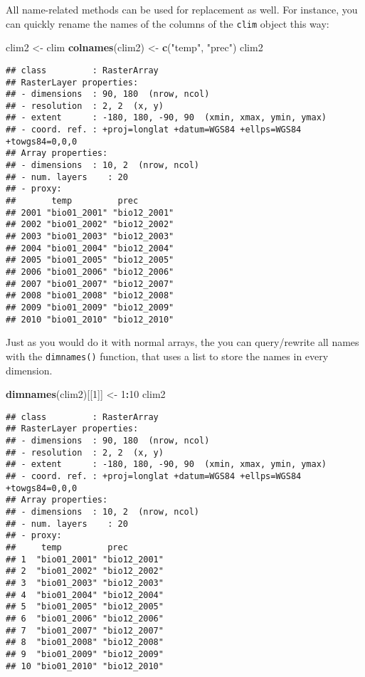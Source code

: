 \documentclass[]{article}
\newenvironment{Shaded}{\begin{snugshade}}{\end{snugshade}}
\newcommand{\KeywordTok}[1]{\textcolor[rgb]{0.13,0.29,0.53}{\textbf{#1}}}
\newcommand{\DecValTok}[1]{\textcolor[rgb]{0.00,0.00,0.81}{#1}}
\newcommand{\StringTok}[1]{\textcolor[rgb]{0.31,0.60,0.02}{#1}}
\newcommand{\OperatorTok}[1]{\textcolor[rgb]{0.81,0.36,0.00}{\textbf{#1}}}
\newcommand{\NormalTok}[1]{#1}
\begin{document}
All name-related methods can be used for replacement as well. For
instance, you can quickly rename the names of the columns of the
\texttt{clim} object this way:

\begin{Shaded}
\begin{Highlighting}[]
\NormalTok{clim2 <-}\StringTok{ }\NormalTok{clim}
\KeywordTok{colnames}\NormalTok{(clim2) <-}\StringTok{ }\KeywordTok{c}\NormalTok{(}\StringTok{"temp"}\NormalTok{, }\StringTok{"prec"}\NormalTok{)}
\NormalTok{clim2}
\end{Highlighting}
\end{Shaded}

\begin{verbatim}
## class         : RasterArray 
## RasterLayer properties: 
## - dimensions  : 90, 180  (nrow, ncol)
## - resolution  : 2, 2  (x, y)
## - extent      : -180, 180, -90, 90  (xmin, xmax, ymin, ymax)
## - coord. ref. : +proj=longlat +datum=WGS84 +ellps=WGS84 +towgs84=0,0,0 
## Array properties: 
## - dimensions  : 10, 2  (nrow, ncol)
## - num. layers    : 20
## - proxy:
##       temp         prec        
## 2001 "bio01_2001" "bio12_2001"
## 2002 "bio01_2002" "bio12_2002"
## 2003 "bio01_2003" "bio12_2003"
## 2004 "bio01_2004" "bio12_2004"
## 2005 "bio01_2005" "bio12_2005"
## 2006 "bio01_2006" "bio12_2006"
## 2007 "bio01_2007" "bio12_2007"
## 2008 "bio01_2008" "bio12_2008"
## 2009 "bio01_2009" "bio12_2009"
## 2010 "bio01_2010" "bio12_2010"
\end{verbatim}

Just as you would do it with normal arrays, the you can query/rewrite
all names with the \texttt{dimnames()} function, that uses a list to
store the names in every dimension.

\begin{Shaded}
\begin{Highlighting}[]
\KeywordTok{dimnames}\NormalTok{(clim2)[[}\DecValTok{1}\NormalTok{]] <-}\StringTok{ }\DecValTok{1}\OperatorTok{:}\DecValTok{10}
\NormalTok{clim2}
\end{Highlighting}
\end{Shaded}

\begin{verbatim}
## class         : RasterArray 
## RasterLayer properties: 
## - dimensions  : 90, 180  (nrow, ncol)
## - resolution  : 2, 2  (x, y)
## - extent      : -180, 180, -90, 90  (xmin, xmax, ymin, ymax)
## - coord. ref. : +proj=longlat +datum=WGS84 +ellps=WGS84 +towgs84=0,0,0 
## Array properties: 
## - dimensions  : 10, 2  (nrow, ncol)
## - num. layers    : 20
## - proxy:
##     temp         prec        
## 1  "bio01_2001" "bio12_2001"
## 2  "bio01_2002" "bio12_2002"
## 3  "bio01_2003" "bio12_2003"
## 4  "bio01_2004" "bio12_2004"
## 5  "bio01_2005" "bio12_2005"
## 6  "bio01_2006" "bio12_2006"
## 7  "bio01_2007" "bio12_2007"
## 8  "bio01_2008" "bio12_2008"
## 9  "bio01_2009" "bio12_2009"
## 10 "bio01_2010" "bio12_2010"
\end{verbatim}
\end{document}
